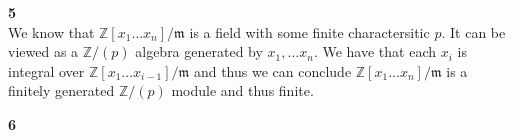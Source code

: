 \documentclass[12pt]{article}
\newenvironment{ques}[1]{\textbf{#1}\vspace{1 mm}\\ }{\bigskip}
\theoremstyle{definition}
\newcommand{\Z}{\mathbb Z}
\begin{document}
\begin{ques}{5}
	We know that $\Z[x_1 \dots x_n]/\mathfrak m$ is a field with some finite
	charactersitic $p$. It can be viewed as a $\Z/(p)$ algebra generated by
	$x_1, \dots x_n$. We have that each $x_i$ is integral over $\Z[x_1 \dots
	x_{i-1}]/\mathfrak m$ and thus we can conclude
	$\Z[x_1 \dots x_n]/\mathfrak m$ is a finitely generated $\Z/(p)$ module and
	thus finite. \\
\end{ques}

\begin{ques}{6}
\end{ques}
\end{document}
